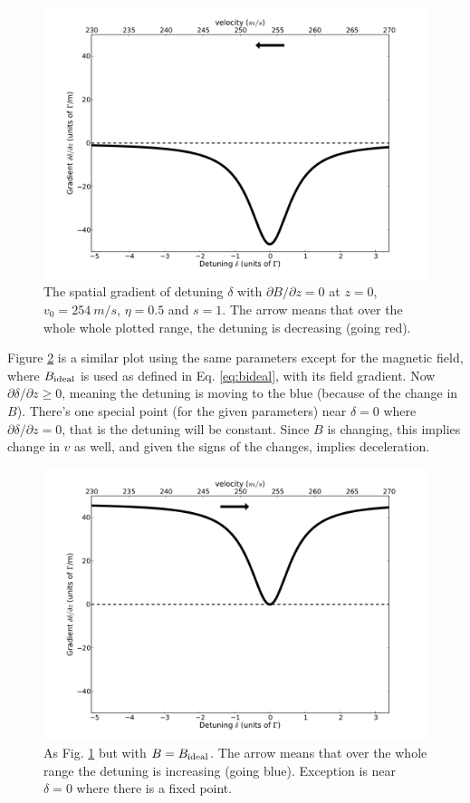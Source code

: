 \documentclass[12pt,a4paper]{article}
\begin{document}
\begin{figure}[htb]
\centering
\includegraphics[width=1.0\textwidth]{detu1}
\caption{The spatial gradient of detuning $\delta$ with $\partial B/\partial z=0$ at $z=0$, $v_0 = 254~m/s$, $\eta = 0.5$ and $s = 1$. The arrow means that over the whole whole plotted range, the detuning is decreasing (going red).}
\label{fig:dddz1}
\end{figure}

Figure \ref{fig:dddz2} is a similar plot using the same parameters except for the magnetic field, where $B_{\rm ideal}$ is used as defined in Eq. \ref{eq:bideal}, with its field gradient. Now $\partial \delta / \partial z \geq 0$, meaning the detuning is moving to the blue (because of the change in $B$). There's one special point (for the given parameters) near $\delta = 0$ where $\partial \delta / \partial z = 0$, that is the detuning will be constant. Since $B$ is changing, this implies change in $v$ as well, and given the signs of the changes, implies deceleration.

\begin{figure}[htb]
\centering
\includegraphics[width=1.0\textwidth]{detu2}
\caption{As Fig. \ref{fig:dddz1} but with $B=B_{\rm ideal}$. The arrow means that over the whole range the detuning is increasing (going blue). Exception is near $\delta = 0$ where there is a fixed point.}
\label{fig:dddz2}
\end{figure}
\end{document}
